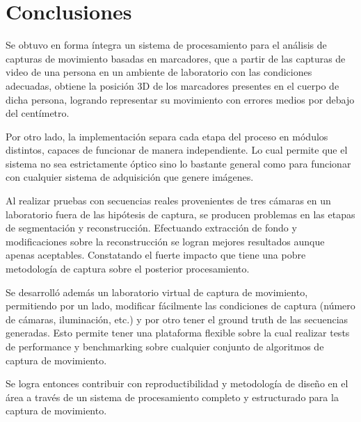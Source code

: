 \section{Conclusiones}

Se obtuvo en forma íntegra un sistema de procesamiento para el análisis de capturas de movimiento basadas en marcadores, que a partir de las capturas de video de una persona en un ambiente de laboratorio con las condiciones adecuadas, obtiene la posición 3D de  los marcadores presentes en el cuerpo de dicha persona, logrando representar su movimiento con errores medios por debajo del centímetro.
%

Por otro lado, la implementación separa cada etapa del proceso en módulos distintos, capaces de funcionar de manera independiente. Lo cual permite que el sistema no sea estrictamente óptico sino lo bastante general como para funcionar con cualquier sistema de adquisición que genere imágenes. %

Al realizar pruebas con secuencias reales  provenientes de tres cámaras en un laboratorio fuera de las hipótesis de captura, se producen problemas en las etapas de segmentación y reconstrucción. Efectuando extracción de fondo y modificaciones sobre la reconstrucción se logran mejores resultados aunque apenas aceptables. Constatando el fuerte impacto que tiene una pobre metodología de captura sobre el posterior procesamiento.

Se desarrolló además un laboratorio virtual de captura de movimiento, permitiendo por un lado, modificar fácilmente las condiciones de captura (número de cámaras, iluminación, etc.) y por otro tener el ground truth de las secuencias generadas. Esto permite tener una plataforma flexible sobre la cual realizar tests de performance y benchmarking sobre cualquier conjunto de algoritmos de captura de movimiento.

Se logra entonces contribuir con reproductibilidad y metodología de diseño en el área a través de un sistema de procesamiento completo y estructurado para la captura de movimiento.

